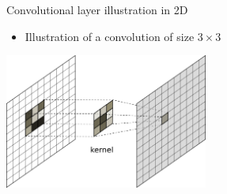 \documentclass[xcolor=pdftex,dvipsnames,table,mathserif]{beamer}
\begin{document}
\begin{frame}{Convolutional layer illustration in 2D}


  \begin{itemize}
  \item Illustration of a convolution of size $3 \times 3$
  \end{itemize}

  \begin{center}
    \includegraphics[width=0.5\textwidth]{conv_base}
  \end{center}


\end{frame}
\end{document}
